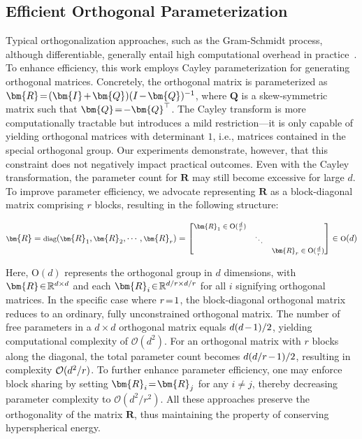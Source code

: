 \subsection{Efficient Orthogonal Parameterization}\label{sect:eff_ortho}

Typical orthogonalization approaches, such as the Gram-Schmidt process, although differentiable, generally entail high computational overhead in practice~\cite{liu2021orthogonal}. To enhance efficiency, this work employs Cayley parameterization for generating orthogonal matrices. Concretely, the orthogonal matrix is parameterized as $\thickmuskip=2mu \medmuskip=2mu \bm{R}=(\bm{I}+\bm{Q})(I-\bm{Q})^{-1}$, where $\bm{Q}$ is a skew-symmetric matrix such that $\thickmuskip=2mu \medmuskip=2mu \bm{Q}=-\bm{Q}^\top$. The Cayley transform is more computationally tractable but introduces a mild restriction—it is only capable of yielding orthogonal matrices with determinant $1$, i.e., matrices contained in the special orthogonal group. Our experiments demonstrate, however, that this constraint does not negatively impact practical outcomes. Even with the Cayley transformation, the parameter count for $\bm{R}$ may still become excessive for large $d$. To improve parameter efficiency, we advocate representing $\bm{R}$ as a block-diagonal matrix comprising $r$ blocks, resulting in the following structure:

\begin{equation}
    \footnotesize
    \bm{R}=\text{diag}(\bm{R}_1,\bm{R}_2,\cdots,\bm{R}_r)=\begin{bmatrix}
    \bm{R}_1\in \text{O}(\frac{d}{r}) &  &\\
    &\ddots & \\
    & & \bm{R}_r\in \text{O}(\frac{d}{r})
    \end{bmatrix}\in \text{O}(d)
\end{equation}

Here, $\text{O}(d)$ represents the orthogonal group in $d$ dimensions, with $\thickmuskip=2mu \medmuskip=2mu \bm{R}\in\mathbb{R}^{d\times d}$ and each $\thickmuskip=2mu \medmuskip=2mu \bm{R}_i\in\mathbb{R}^{d/r\times d/r}$ for all $i$ signifying orthogonal matrices. In the specific case where $\thickmuskip=2mu \medmuskip=2mu r=1$, the block-diagonal orthogonal matrix reduces to an ordinary, fully unconstrained orthogonal matrix. The number of free parameters in a $d\times d$ orthogonal matrix equals $\thickmuskip=2mu \medmuskip=2mu d(d-1)/2$, yielding computational complexity of $\mathcal{O}(d^2)$. For an orthogonal matrix with $r$ blocks along the diagonal, the total parameter count becomes $\thickmuskip=2mu \medmuskip=2mu d(d/r-1)/2$, resulting in complexity $\thickmuskip=2mu \medmuskip=2mu \mathcal{O}(d^2/r)$. To further enhance parameter efficiency, one may enforce block sharing by setting $\thickmuskip=2mu \medmuskip=2mu \bm{R}_i=\bm{R}_j$ for any $i\neq j$, thereby decreasing parameter complexity to $\mathcal{O}(d^2/r^2)$. All these approaches preserve the orthogonality of the matrix $\bm{R}$, thus maintaining the property of conserving hyperspherical energy.


